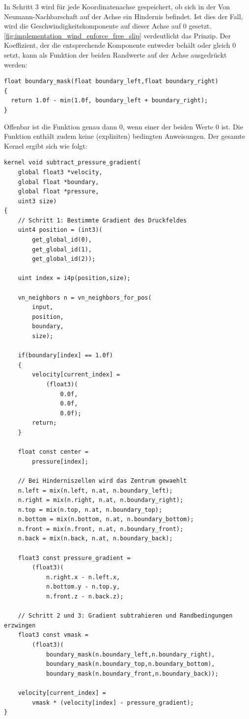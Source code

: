 In Schritt 3 wird für jede Koordinatenachse gespeichert, ob sich in
der Von Neumann-Nachbarschaft auf der Achse ein Hindernis
befindet. Ist dies der Fall, wird die Geschwindigkeitskomponente auf
dieser Achse auf 0
gesetzt. \autoref{fig:implementation_wind_enforce_free_slip}
verdeutlicht das Prinzip. Der Koeffizient, der die entsprechende
Komponente entweder behält oder gleich 0 setzt, kann als Funktion der
beiden Randwerte auf der Achse ausgedrückt werden:
\begin{verbatim}
float boundary_mask(float boundary_left,float boundary_right)
{
  return 1.0f - min(1.0f, boundary_left + boundary_right);
}
\end{verbatim}
Offenbar ist die Funktion genau dann $0$, wenn einer der beiden Werte
0 ist. Die Funktion enthält zudem keine (expliziten) bedingten
Anweisungen. Der gesamte Kernel ergibt sich wie folgt:
\begin{verbatim}
kernel void subtract_pressure_gradient(
    global float3 *velocity,
    global float *boundary,
    global float *pressure,
    uint3 size)
{
    // Schritt 1: Bestimmte Gradient des Druckfeldes
    uint4 position = (int3)(
        get_global_id(0),
        get_global_id(1),
        get_global_id(2));

    uint index = i4p(position,size);

    vn_neighbors n = vn_neighbors_for_pos(
        input,
        position,
        boundary,
        size);

    if(boundary[index] == 1.0f)
    {
        velocity[current_index] =
            (float3)(
                0.0f,
                0.0f,
                0.0f);
        return;
    }

    float const center =
        pressure[index];

    // Bei Hinderniszellen wird das Zentrum gewaehlt
    n.left = mix(n.left, n.at, n.boundary_left);
    n.right = mix(n.right, n.at, n.boundary_right);
    n.top = mix(n.top, n.at, n.boundary_top);
    n.bottom = mix(n.bottom, n.at, n.boundary_bottom);
    n.front = mix(n.front, n.at, n.boundary_front);
    n.back = mix(n.back, n.at, n.boundary_back);

    float3 const pressure_gradient =
        (float3)(
            n.right.x - n.left.x,
            n.bottom.y - n.top.y,
            n.front.z - n.back.z);

    // Schritt 2 und 3: Gradient subtrahieren und Randbedingungen erzwingen
    float3 const vmask =
        (float3)(
            boundary_mask(n.boundary_left,n.boundary_right),
            boundary_mask(n.boundary_top,n.boundary_bottom),
            boundary_mask(n.boundary_front,n.boundary_back));

    velocity[current_index] =
        vmask * (velocity[index] - pressure_gradient);
}
\end{verbatim}


